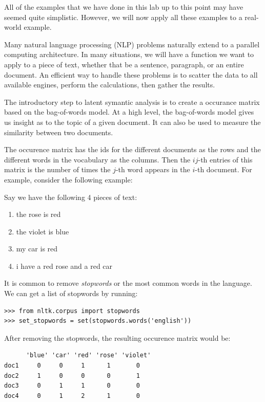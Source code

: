 \begin{problem}
All of the examples that we have done in this lab up to this point may have seemed quite simplistic. However, we will now apply all these examples to a real-world example.

Many natural language processing (NLP) problems naturally extend to a parallel computing architecture. In many situations, we will have a function we want to apply to a piece of text, whether that be a sentence, paragraph, or an entire document. An efficient way to handle these problems is to scatter the data to all available engines, perform the calculations, then gather the results.

The introductory step to latent symantic analysis is to create a occurance matrix based on the bag-of-words model. At a high level, the bag-of-words model gives us insight as to the topic of a given document. It can also be used to measure the similarity between two documents.

The occurence matrix has the ids for the different documents as the rows and the different words in the vocabulary as the columns. Then the $ij$-th entries of this matrix is the number of times the $j$-th word appears in the $i$-th document. For example, consider the following example:

Say we have the following 4 pieces of text:
\begin{enumerate}
    \item the rose is red
    \item the violet is blue
    \item my car is red
    \item i have a red rose and a red car
\end{enumerate}

It is common to remove \emph{stopwords} or the most common words in the language. We can get a list of stopwords by running:
\begin{lstlisting}
>>> from nltk.corpus import stopwords
>>> set_stopwords = set(stopwords.words('english'))
\end{lstlisting}

After removing the stopwords, the resulting occurence matrix would be:
\begin{lstlisting}
      'blue' 'car' 'red' 'rose' 'violet'
doc1     0     0     1      1       0
doc2     1     0     0      0       1
doc3     0     1     1      0       0
doc4     0     1     2      1       0
\end{lstlisting}


\end{problem}
